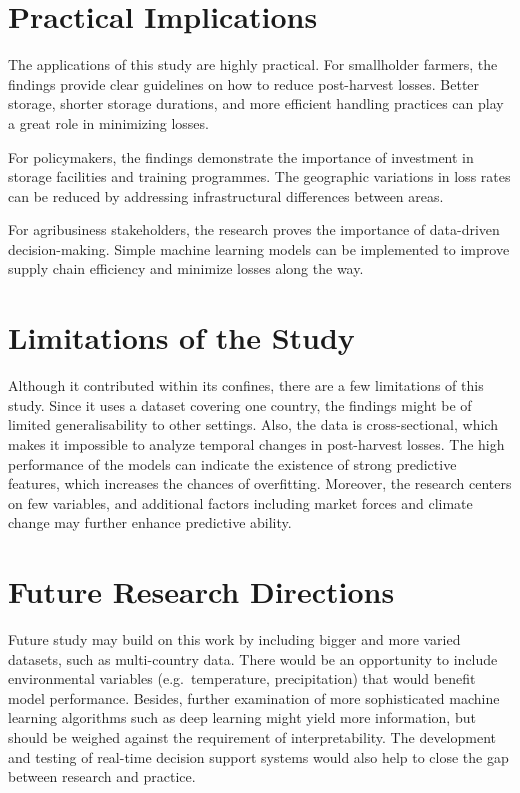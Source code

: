 \section{Practical Implications}

The applications of this study are highly practical. For smallholder farmers, the findings provide
clear guidelines on how to reduce post-harvest losses. Better storage, shorter storage durations,
and more efficient handling practices can play a great role in minimizing losses.

For policymakers, the findings demonstrate the importance of investment in storage facilities and
training programmes. The geographic variations in loss rates can be reduced by addressing
infrastructural differences between areas.

For agribusiness stakeholders, the research proves the importance of data-driven decision-making.
Simple machine learning models can be implemented to improve supply chain efficiency and minimize
losses along the way.


\section{Limitations of the Study}

Although it contributed within its confines, there are a few limitations of this study. Since it uses a dataset covering one country, the findings might be of limited generalisability to other
settings. Also, the data is cross-sectional, which makes it impossible to analyze temporal changes in post-harvest losses. The high performance of the models can indicate the existence of strong
predictive features, which increases the chances of overfitting. Moreover, the research centers on few variables, and additional factors including market forces and climate change may further enhance
predictive ability.


\section{Future Research Directions}

Future study may build on this work by including bigger and more varied datasets, such as
multi-country data. There would be an opportunity to include environmental variables (e.g.\
temperature, precipitation) that would benefit model performance. Besides, further examination of
more sophisticated machine learning algorithms such as deep learning might yield more information,
but should be weighed against the requirement of interpretability. The development and testing of
real-time decision support systems would also help to close the gap between research and practice.
